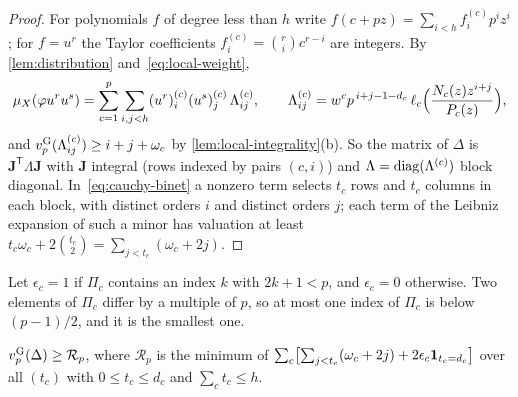 \begin{proof}
For polynomials $f$ of degree less than $h$ write $f(c+pz)=\sum_{i<h}f^{(c)}_ip^iz^i$; for
$f=u^r$ the Taylor coefficients $f^{(c)}_i=\binom ri c^{r-i}$ are integers. By
\cref{lem:distribution} and~\eqref{eq:local-weight},
\[
  \mu_X(\varphi u^ru^s)=\sum_{c=1}^p\sum_{i,j<h}(u^r)^{(c)}_i(u^s)^{(c)}_j\,\Lambda^{(c)}_{ij},
  \qquad
  \Lambda^{(c)}_{ij}=w^cp^{\,i+j-1-d_c}\,\ell_c\Bigl(\frac{N_c(z)z^{i+j}}{P_c(z)}\Bigr),
\]
and $v_{p}^{\mathrm{G}}(\Lambda^{(c)}_{ij})\ge i+j+\omega_c$ by \cref{lem:local-integrality}(b). So the matrix of
$\Delta$ is $\mathbf J^{\mathsf T}\Lambda\mathbf J$ with $\mathbf J$ integral (rows indexed by
pairs $(c,i)$) and $\Lambda=\operatorname{diag}(\Lambda^{(c)})$ block diagonal. In~\eqref{eq:cauchy-binet} a
nonzero term selects $t_c$ rows and $t_c$ columns in each block, with distinct orders $i$ and
distinct orders $j$; each term of the Leibniz expansion of such a minor has valuation at least
$t_c\omega_c+2\binom{t_c}2=\sum_{j<t_c}(\omega_c+2j)$.
\end{proof}

Let $\epsilon_c=1$ if $\Pi_c$ contains an index $k$ with $2k+1<p$, and $\epsilon_c=0$
otherwise. Two elements of $\Pi_c$ differ by a multiple of $p$, so at most one index of $\Pi_c$
is below $(p-1)/2$, and it is the smallest one.

\begin{proposition}\label{prop:raw}
$v_{p}^{\mathrm{G}}(\Delta)\ge\mathcal R_p$, where $\mathcal R_p$ is the minimum of
$\sum_c\bigl[\sum_{j<t_c}(\omega_c+2j)+2\epsilon_c\mathbf{1}_{t_c=d_c}\bigr]$ over all $(t_c)$ with
$0\le t_c\le d_c$ and $\sum_ct_c\le h$.
\end{proposition}

